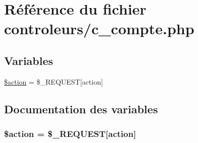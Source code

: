 \hypertarget{c__compte_8php}{}\section{Référence du fichier controleurs/c\+\_\+compte.php}
\label{c__compte_8php}
\subsection*{Variables}
\begin{DoxyCompactItemize}
\item 
\hyperlink{c__compte_8php_aa698a3e72116e8e778be0e95d908ee30}{\$action} = \$\+\_\+\+R\+E\+Q\+U\+E\+S\+T\mbox{[}\textquotesingle{}action\textquotesingle{}\mbox{]}
\end{DoxyCompactItemize}


\subsection{Documentation des variables}
\hypertarget{c__compte_8php_aa698a3e72116e8e778be0e95d908ee30}{}
\subsubsection[{\$action}]{\setlength{\rightskip}{0pt plus 5cm}\$action = \$\+\_\+\+R\+E\+Q\+U\+E\+S\+T\mbox{[}\textquotesingle{}action\textquotesingle{}\mbox{]}}\label{c__compte_8php_aa698a3e72116e8e778be0e95d908ee30}

